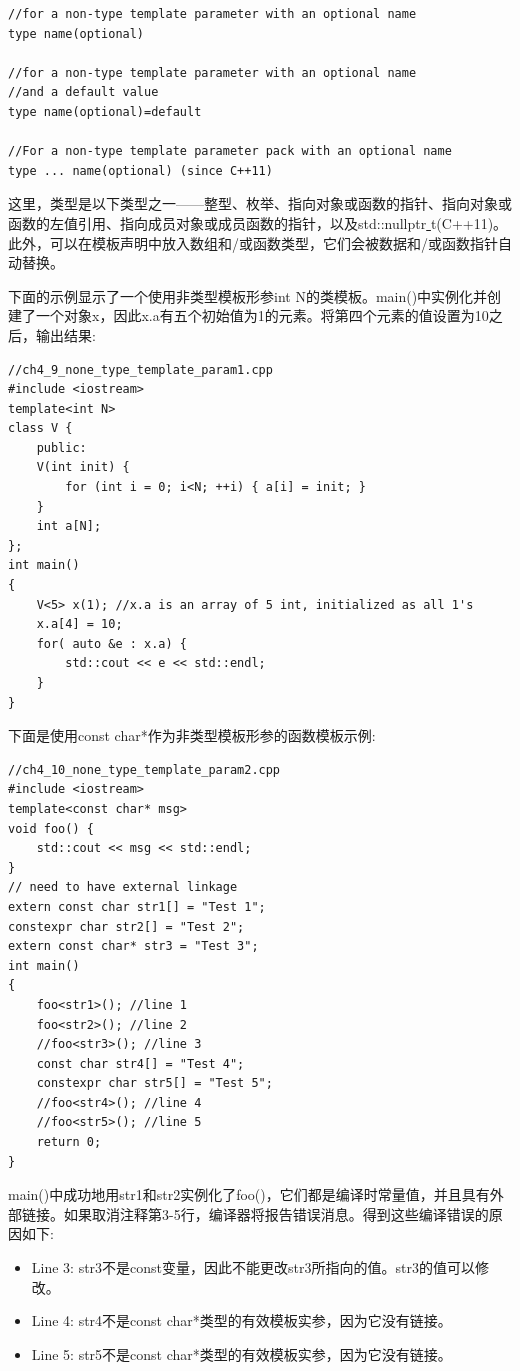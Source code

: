 \begin{lstlisting}[caption={}]
//for a non-type template parameter with an optional name
type name(optional)

//for a non-type template parameter with an optional name
//and a default value
type name(optional)=default

//For a non-type template parameter pack with an optional name
type ... name(optional) (since C++11)
\end{lstlisting}

这里，类型是以下类型之一——整型、枚举、指向对象或函数的指针、指向对象或函数的左值引用、指向成员对象或成员函数的指针，以及std::nullptr\underline{ }t(C++11)。此外，可以在模板声明中放入数组和/或函数类型，它们会被数据和/或函数指针自动替换。 \par
下面的示例显示了一个使用非类型模板形参int N的类模板。main()中实例化并创建了一个对象x，因此x.a有五个初始值为1的元素。将第四个元素的值设置为10之后，输出结果:\par

\begin{lstlisting}[caption={}]
//ch4_9_none_type_template_param1.cpp
#include <iostream>
template<int N>
class V {
	public:
	V(int init) {
		for (int i = 0; i<N; ++i) { a[i] = init; }
	}
	int a[N];
};
int main()
{
	V<5> x(1); //x.a is an array of 5 int, initialized as all 1's
	x.a[4] = 10;
	for( auto &e : x.a) {
		std::cout << e << std::endl;
	}
}
\end{lstlisting}

下面是使用const char*作为非类型模板形参的函数模板示例: \par

\begin{lstlisting}[caption={}]
//ch4_10_none_type_template_param2.cpp
#include <iostream>
template<const char* msg>
void foo() {
	std::cout << msg << std::endl;
}
// need to have external linkage
extern const char str1[] = "Test 1";
constexpr char str2[] = "Test 2";
extern const char* str3 = "Test 3";
int main()
{
	foo<str1>(); //line 1
	foo<str2>(); //line 2
	//foo<str3>(); //line 3
	const char str4[] = "Test 4";
	constexpr char str5[] = "Test 5";
	//foo<str4>(); //line 4
	//foo<str5>(); //line 5
	return 0;
}
\end{lstlisting}

main()中成功地用str1和str2实例化了foo()，它们都是编译时常量值，并且具有外部链接。如果取消注释第3-5行，编译器将报告错误消息。得到这些编译错误的原因如下: \par

\begin{itemize}
	\item Line 3:  str3不是const变量，因此不能更改str3所指向的值。str3的值可以修改。
	\item Line 4:  str4不是const char*类型的有效模板实参，因为它没有链接。
	\item Line 5:  str5不是const char*类型的有效模板实参，因为它没有链接。
\end{itemize}

